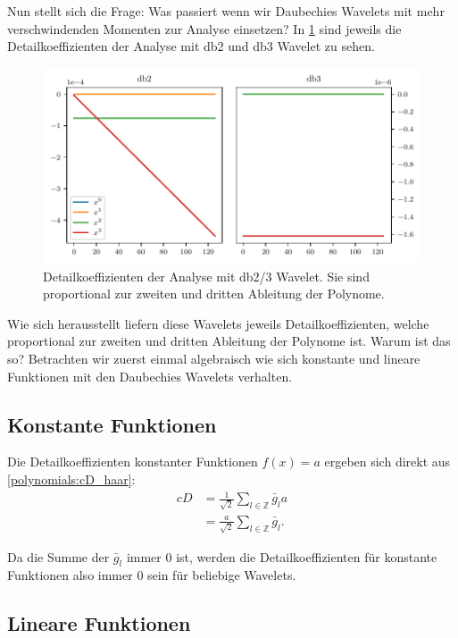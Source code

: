 \begin{refsection}
Nun stellt sich die Frage: Was passiert wenn wir Daubechies Wavelets mit mehr
verschwindenden Momenten zur Analyse einsetzen? In \cref{polynomials:db2_3}
sind jeweils die Detailkoeffizienten der Analyse mit db2 und db3 Wavelet zu
sehen.

\begin{figure}
    \centering
    \includegraphics{papers/polynomials/images/polynomials_signals_db2_3.pdf}
    \caption{Detailkoeffizienten der Analyse mit db2/3 Wavelet. Sie sind
             proportional zur zweiten und dritten Ableitung der
             Polynome.\label{polynomials:db2_3}}
\end{figure}

Wie sich herausstellt liefern diese Wavelets jeweils Detailkoeffizienten,
welche proportional zur zweiten und dritten Ableitung der Polynome ist.
Warum ist das so?
Betrachten wir zuerst einmal algebraisch wie sich konstante und lineare
Funktionen mit den Daubechies Wavelets verhalten.

\subsection{Konstante Funktionen}
Die Detailkoeffizienten konstanter Funktionen $f(x) = a$ ergeben sich direkt
aus \cref{polynomials:cD_haar}:
\begin{align*}
    cD &= \frac{1}{\sqrt{2}} \sum_{l\in\mathbb Z} \bar{g}_l a \\
       &= \frac{a}{\sqrt{2}} \sum_{l\in\mathbb Z} \bar{g}_l.
\end{align*}

Da die Summe der $\bar{g}_l$ immer 0 ist, werden die Detailkoeffizienten für
konstante Funktionen also immer 0 sein für beliebige Wavelets.

\subsection{Lineare Funktionen}


\end{refsection}
